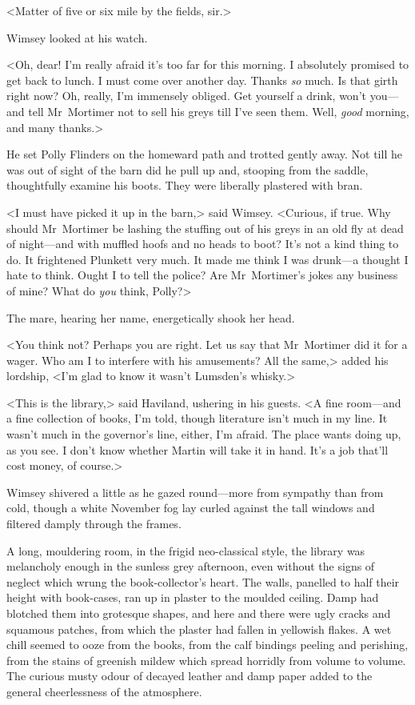 <Matter of five or six mile by the fields, sir.>

Wimsey looked at his watch.

<Oh, dear! I'm really afraid it's too far for this morning. I absolutely promised to get back to lunch. I must come over another day. Thanks \emph{so} much. Is that girth right now? Oh, really, I'm immensely obliged. Get yourself a drink, won't you—and tell Mr~Mortimer not to sell his greys till I've seen them. Well, \emph{good} morning, and many thanks.>

He set Polly Flinders on the homeward path and trotted gently away. Not till he was out of sight of the barn did he pull up and, stooping from the saddle, thoughtfully examine his boots. They were liberally plastered with bran.

<I must have picked it up in the barn,> said Wimsey. <Curious, if true. Why should Mr~Mortimer be lashing the stuffing out of his greys in an old fly at dead of night—and with muffled hoofs and no heads to boot? It's not a kind thing to do. It frightened Plunkett very much. It made me think I was drunk—a thought I hate to think. Ought I to tell the police? Are Mr~Mortimer's jokes any business of mine? What do \emph{you} think, Polly?>

The mare, hearing her name, energetically shook her head.

<You think not? Perhaps you are right. Let us say that Mr~Mortimer did it for a wager. Who am I to interfere with his amusements? All the same,> added his lordship, <I'm glad to know it wasn't Lumsden's whisky.>

\divider
<This is the library,> said Haviland, ushering in his guests. <A fine room—and a fine collection of books, I'm told, though literature isn't much in my line. It wasn't much in the governor's line, either, I'm afraid. The place wants doing up, as you see. I don't know whether Martin will take it in hand. It's a job that'll cost money, of course.>

Wimsey shivered a little as he gazed round—more from sympathy than from cold, though a white November fog lay curled against the tall windows and filtered damply through the frames.

A long, mouldering room, in the frigid neo-classical style, the library was melancholy enough in the sunless grey afternoon, even without the signs of neglect which wrung the book-collector's heart. The walls, panelled to half their height with book-cases, ran up in plaster to the moulded ceiling. Damp had blotched them into grotesque shapes, and here and there were ugly cracks and squamous patches, from which the plaster had fallen in yellowish flakes. A wet chill seemed to ooze from the books, from the calf bindings peeling and perishing, from the stains of greenish mildew which spread horridly from volume to volume. The curious musty odour of decayed leather and damp paper added to the general cheerlessness of the atmosphere.

